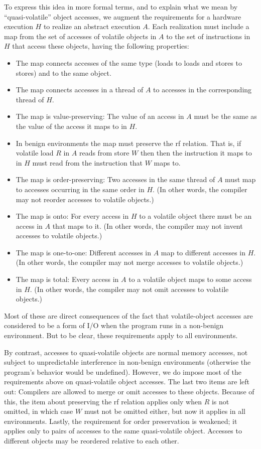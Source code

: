 \documentclass[10]{article}
\begin{document}
To express this idea in more formal terms,
and to explain what we mean by ``quasi-volatile'' object accesses,
we augment the
requirements for a hardware execution $H$ to realize an abstract
execution $A$.
Each realization must include a map from the set of accesses of
volatile objects in $A$ to the set of instructions in $H$ that access
these objects, having the following properties:
\begin{itemize}
\item	The map connects accesses of the same type (loads to loads
	and stores to stores) and to the same object.
\item	The map connects accesses in a thread of $A$ to accesses in
	the corresponding thread of $H$.
\item	The map is value-preserving: The value of an access in $A$ must be
	the same as the value of the access it maps to in $H$.
\item	In benign environments the map must preserve the rf relation.
	That is, if volatile load $R$ in $A$ reads from store $W$ then
	then the instruction it maps to in $H$ must read from the
	instruction that $W$ maps to.
\item	The map is order-preserving: Two accesses in the same thread
	of $A$ must map to accesses occurring in the same order in $H$.
	(In other words, the compiler may not reorder accesses
	to volatile objects.)
\item	The map is onto: For every access in $H$ to a volatile object
	there must be an access in $A$ that maps to it.
	(In other words, the compiler may not invent accesses to
	volatile objects.)
\item	The map is one-to-one: Different accesses in $A$ map to
	different accesses in $H$.
	(In other words, the compiler may not merge accesses to
	volatile objects.)
\item	The map is total: Every access in $A$ to a volatile object
	maps to some access in $H$.
	(In other words, the compiler may not omit accesses to
	volatile objects.)
\end{itemize}
Most of these are direct consequences of the fact that volatile-object
accesses are considered to be a form of I/O when the program runs
in a non-benign environment.
But to be clear, these requirements apply to all environments.

By contrast, accesses to quasi-volatile objects are normal memory
accesses, not subject to unpredictable interference in non-benign
environments (otherwise the program's behavior would be undefined).
However, we do impose most of the requirements above on quasi-volatile
object accesses.
The last two items are left out: Compilers are allowed to merge or
omit accesses to these objects.
Because of this, the item about preserving the rf relation
applies only when $R$ is not omitted, in which case $W$ must not
be omitted either, but now it applies in all environments.
Lastly, the requirement for order preservation is weakened; it applies
only to pairs of accesses to the same quasi-volatile object.
Accesses to different objects may be reordered relative to each other.
\end{document}
